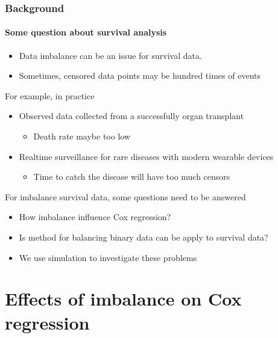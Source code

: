 \documentclass{beamer}
\begin{document}
    \begin{frame}
        \frametitle{Background}
        \framesubtitle{Some question about survival analysis}
        \begin{itemize}
			\item Data imbalance can be an issue for survival data.
            \item Sometimes, censored data points may be hundred times of events
        \end{itemize}
        For example, in practice
        \begin{itemize}
            \item Observed data collected from a successfully organ transplant
            \begin{itemize}
                \item Death rate maybe too low
            \end{itemize}
            \item Realtime surveillance for rare diseases with modern wearable devices
            \begin{itemize}
                \item  Time to catch the disease will have too much censors
            \end{itemize}
        \end{itemize}
        For imbalance survival data, some questions need to be answered
            \begin{itemize} 
                \item How imbalance influence Cox regression?
				\item Is method for balancing binary data can be apply to survival data? 
            \end{itemize}
            \begin{itemize}
                \item We use simulation to investigate these problems
            \end{itemize}
    \end{frame}
    
 \section{Effects of imbalance on Cox regression}
\end{document}
